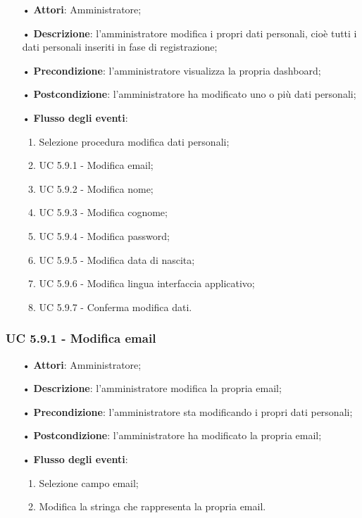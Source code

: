 \begin{itemize}
	\item[•]\textbf{Attori}: Amministratore;
	\item[•]\textbf{Descrizione}: l'amministratore modifica i propri dati personali, cioè tutti i dati personali inseriti in fase di registrazione;
	\item[•]\textbf{Precondizione}: l'amministratore visualizza la propria dashboard;
	\item[•]\textbf{Postcondizione}: l'amministratore ha modificato uno o più dati personali; 
	\item[•]\textbf{Flusso degli eventi}: 
	\begin{enumerate}
		\item Selezione procedura modifica dati personali;
		\item UC 5.9.1 - Modifica email; 
		\item UC 5.9.2 - Modifica nome;
		\item UC 5.9.3 - Modifica cognome;
		\item UC 5.9.4 - Modifica password;
		\item UC 5.9.5 - Modifica data di nascita;
		\item UC 5.9.6 - Modifica lingua interfaccia applicativo;
		\item UC 5.9.7 - Conferma modifica dati.
	\end{enumerate}
\end{itemize}
\subsubsection{UC 5.9.1 - Modifica email}
\begin{itemize}
	\item[•]\textbf{Attori}: Amministratore;
	\item[•]\textbf{Descrizione}: l'amministratore modifica la propria email;
	\item[•]\textbf{Precondizione}: l'amministratore sta modificando i propri dati personali;
	\item[•]\textbf{Postcondizione}: l'amministratore ha modificato la propria email; 
	\item[•]\textbf{Flusso degli eventi}: 
	\begin{enumerate}
		\item Selezione campo email;
		\item Modifica la stringa che rappresenta la propria email.
	\end{enumerate}
\end{itemize}
